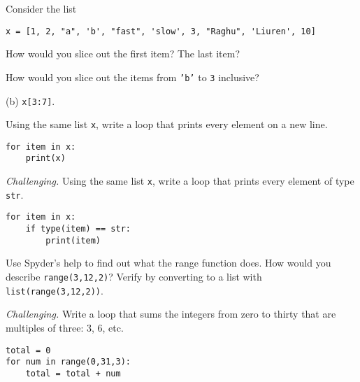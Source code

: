 \documentclass[11pt]{exam}
\begin{document}
\begin{questions}
\item Consider the list
\begin{verbatim}
x = [1, 2, "a", 'b', "fast", 'slow', 3, "Raghu", 'Liuren', 10]
\end{verbatim}
\begin{parts}
\item How would you slice out the first item?  The last item?
\item How would you slice out the items from {\tt 'b'} to {\tt 3} inclusive?
\end{parts}

\begin{solution}
(b) {\tt x[3:7]}.
\end{solution}

\item Using the same list {\tt x}, write a loop that prints every element on a new line.

\begin{solution}
\begin{verbatim}
for item in x:
    print(x)
\end{verbatim}
\end{solution}

\item {\it Challenging.\/}
Using the same list {\tt x}, write a loop that prints every element of type {\tt str}.

\begin{solution}
\begin{verbatim}
for item in x:
    if type(item) == str:
        print(item)
\end{verbatim}
\end{solution}


\item Use Spyder's help to find out what the range function does.
How would you describe {\tt range(3,12,2)}?
Verify by converting to a list with {\tt list(range(3,12,2))}.

\item {\it Challenging.\/}
Write a loop that sums the integers from zero to thirty that are multiples of three:
3, 6, etc.

\begin{solution}
\begin{verbatim}
total = 0
for num in range(0,31,3):
    total = total + num
\end{verbatim}
\end{solution}



\end{questions}
\end{document}
